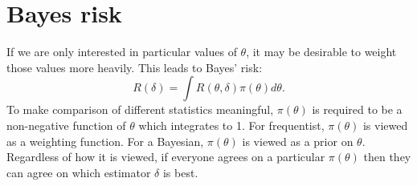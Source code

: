 \documentclass[twoside]{article}
\begin{document}
\section{Bayes risk}

If we are only interested in particular values of $\theta$, it may be desirable
to weight those values more heavily.  This leads to Bayes' risk:
\begin{equation}
R(\delta) = \int R(\theta, \delta) \pi(\theta) d\theta.
\end{equation}
To make comparison of different statistics meaningful, $\pi(\theta)$ is
required to be a non-negative function of $\theta$ which integrates to 1.  For
frequentist, $\pi(\theta)$ is viewed as a weighting function.  For a Bayesian,
$\pi(\theta)$ is viewed as a prior on $\theta$. Regardless of how it is viewed,
if everyone agrees on a particular $\pi(\theta)$ then they can agree on
which estimator $\delta$ is best.



\end{document}
